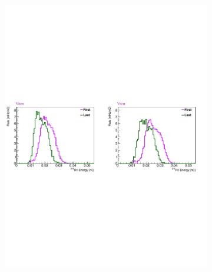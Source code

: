 \begin{figure}[H]
	\begin{subfigure}{1\linewidth}
	\centering
	\includegraphics[width=1.\linewidth]{"tex/6-ac227-images/BNL/RnPoEn_FirstAndLast_S8"}
	\label{fig:rnpoenfirstandlasts8}
\end{subfigure}
\begin{subfigure}{1\linewidth}
	\centering

\end{subfigure}
\end{figure}
